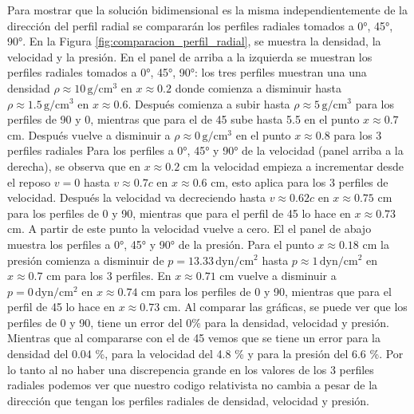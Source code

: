 \documentclass[12pt,a4paper]{book}
\begin{document}
Para mostrar que la solución bidimensional es la misma independientemente de la dirección del perfil
radial se compararán los perfiles radiales tomados a 0°, 45°, 90°. 
En la Figura \ref{fig:comparacion_perfil_radial}, se muestra la densidad, 
la velocidad y la presión.
En el panel de arriba a la izquierda se muestran
los perfiles radiales tomados a 0°, 45°, 90°: los tres perfiles muestran una
una densidad $\rho \approx 10 \, \text{g}/\text{cm}^3$ en $x \approx 0.2$
donde comienza a disminuir hasta $\rho \approx 1.5 \, \text{g}/\text{cm}^3$ en $x \approx 0.6$. Después comienza a subir hasta 
$\rho \approx 5 \, \text{g}/\text{cm}^3$ para los perfiles de 90 y 0, mientras que para el de 45 sube hasta 5.5 en el punto
$x \approx 0.7$ cm. Después vuelve a disminuir a $\rho \approx 0 \, \text{g}/\text{cm}^3$ en el punto $x \approx 0.8$ para los 
3 perfiles radiales
Para los perfiles a 0°, 45° y 90° de la velocidad (panel arriba a la derecha), 
se observa que en $x \approx 0.2$ cm la velocidad empieza a incrementar desde el reposo
$v = 0$ hasta $v \approx 0.7c$ en $x \approx 0.6$ cm, esto aplica para los 3 perfiles de velocidad. 
Después la velocidad
va decreciendo hasta $v \approx 0.62c$ en $x \approx 0.75$ cm para los perfiles de 0 y 90, mientras que para 
el perfil de 45 lo hace en $x \approx 0.73$ cm. A partir de este punto la velocidad vuelve a cero.
El el panel de abajo muestra los perfiles a 0°, 45° y 90° de la presión. 
Para el punto $x \approx 0.18$ cm
la presión comienza a disminuir de $p = 13.33 \,  \text{dyn}/ \text{cm}^2$ 
hasta $p \approx 1 \,  \text{dyn}/ \text{cm}^2$ en $x \approx 0.7$ cm para los 
3 perfiles. En $x \approx 0.71 $ cm vuelve a disminuir a $p = 0 \,  \text{dyn}/ \text{cm}^2$ en 
$x \approx 0.74 $ cm para los perfiles de 
0 y 90, mientras que para el perfil de 45 lo hace en $x \approx 0.73 $ cm.
Al comparar las gráficas, se puede ver que los perfiles de 0 y 90, tiene un error del 0\% 
para la densidad, velocidad y presión. Mientras que
al compararse con el de 45 vemos que se tiene un error para la densidad del 0.04 \%,
para la velocidad del 4.8 \% y para la presión del 6.6 \%.
Por lo tanto al no haber una discrepencia grande en los valores de los 3 perfiles radiales podemos ver
que nuestro codigo relativista no cambia a pesar de la dirección que tengan los perfiles radiales de 
densidad, velocidad y presión.
\end{document}
